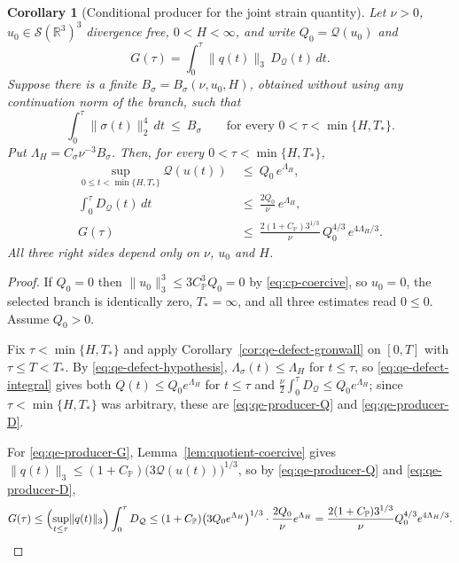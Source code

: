 \documentclass[11pt]{article}
\newtheorem{corollary}[theorem]{Corollary}
\theoremstyle{definition}
\theoremstyle{plain}
\newcommand{\R}{\mathbb R}
\newcommand{\norm}[1]{\lVert #1\rVert}
\begin{document}
\begin{corollary}[Conditional producer for the joint strain quantity]
\label{cor:qe-defect-producer}
Let $\nu>0$, $u_0\in\mathcal S(\R^3)^3$ divergence free, $0<H<\infty$, and
write $Q_0=\mathcal Q(u_0)$ and
\begin{equation}\label{eq:qe-joint-work}
 G(\tau)=\int_0^\tau\norm{q(t)}_3\,D_{\mathcal Q}(t)\,dt .
\end{equation}
Suppose there is a finite $B_\sigma=B_\sigma(\nu,u_0,H)$, obtained without
using any continuation norm of the branch, such that
\begin{equation}\label{eq:qe-defect-hypothesis}
 \int_0^\tau\norm{\sigma(t)}_2^4\,dt\ \le\ B_\sigma
 \qquad\text{for every }0<\tau<\min\{H,T_*\}.
\end{equation}
Put $\Lambda_H=C_\sigma\nu^{-3}B_\sigma$.  Then, for every
$0<\tau<\min\{H,T_*\}$,
\begin{align}
 \sup_{0\le t<\min\{H,T_*\}}\mathcal Q(u(t))
 &\ \le\ Q_0\,e^{\Lambda_H},
 \label{eq:qe-producer-Q}\\
 \int_0^\tau D_{\mathcal Q}(t)\,dt
 &\ \le\ \frac{2Q_0}{\nu}\,e^{\Lambda_H},
 \label{eq:qe-producer-D}\\
 G(\tau)
 &\ \le\ \frac{2(1+C_{\mathbb P})3^{1/3}}{\nu}\,Q_0^{4/3}\,
 e^{4\Lambda_H/3} .
 \label{eq:qe-producer-G}
\end{align}
All three right sides depend only on $\nu$, $u_0$ and $H$.
\end{corollary}

\begin{proof}
If $Q_0=0$ then $\norm{u_0}_3^3\le3C_{\mathbb P}^3Q_0=0$ by
\eqref{eq:cp-coercive}, so $u_0=0$, the selected branch is identically
zero, $T_*=\infty$, and all three estimates read $0\le0$.  Assume
$Q_0>0$.

Fix $\tau<\min\{H,T_*\}$ and apply
Corollary~\ref{cor:qe-defect-gronwall} on $[0,T]$ with
$\tau\le T<T_*$.  By \eqref{eq:qe-defect-hypothesis},
$\Lambda_\sigma(t)\le\Lambda_H$ for $t\le\tau$, so
\eqref{eq:qe-defect-integral} gives both
$Q(t)\le Q_0e^{\Lambda_H}$ for $t\le\tau$ and
$\frac\nu2\int_0^\tau D_{\mathcal Q}\le Q_0e^{\Lambda_H}$; since
$\tau<\min\{H,T_*\}$ was arbitrary, these are
\eqref{eq:qe-producer-Q} and \eqref{eq:qe-producer-D}.

For \eqref{eq:qe-producer-G}, Lemma~\ref{lem:quotient-coercive} gives
$\norm{q(t)}_3\le(1+C_{\mathbb P})\bigl(3\mathcal Q(u(t))\bigr)^{1/3}$, so
by \eqref{eq:qe-producer-Q} and \eqref{eq:qe-producer-D},
\[
 G(\tau)\le\Bigl(\sup_{t\le\tau}\norm{q(t)}_3\Bigr)\int_0^\tau D_{\mathcal Q}
 \le(1+C_{\mathbb P})\bigl(3Q_0e^{\Lambda_H}\bigr)^{1/3}
 \cdot\frac{2Q_0}{\nu}e^{\Lambda_H}
 =\frac{2(1+C_{\mathbb P})3^{1/3}}{\nu}Q_0^{4/3}e^{4\Lambda_H/3}. \qedhere
\]
\end{proof}
\end{document}

